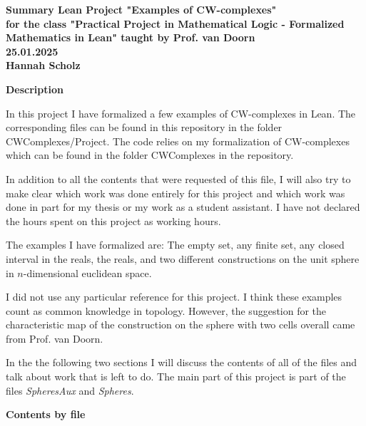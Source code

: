 \documentclass[11pt,a4paper]{article}
\begin{document}
\begin{minipage}{0.75\linewidth}
{
  \Large \bfseries Summary Lean Project "Examples of CW-complexes"\\[0.5ex]
  \mdseries
  \normalsize for the class "Practical Project in Mathematical Logic - Formalized Mathematics in Lean" 
    taught by Prof. van Doorn \\[0.4ex]
  \normalsize 25.01.2025\\[0.4ex]
  \normalsize Hannah Scholz
}
\end{minipage}
\hfill
\begin{minipage}{0.25\linewidth}
\vspace{2mm}
\end{minipage}


\bigskip 
{\bf Description}

\medskip

In this project I have formalized a few examples of CW-complexes in Lean. 
The corresponding files can be found in this repository in the folder CWComplexes/Project.
The code relies on my formalization of CW-complexes which can be found in the folder CWComplexes in the repository.

In addition to all the contents that were requested of this file, I will also try to make clear
which work was done entirely for this project and which work was done in part for my thesis or my work as 
a student assistant. 
I have not declared the hours spent on this project as working hours. 

The examples I have formalized are: The empty set, any finite set, any closed interval in the reals, the reals, and 
two different constructions on the unit sphere in $n$-dimensional euclidean space. 

I did not use any particular reference for this project. I think these examples count as common knowledge in topology.
However, the suggestion for the characteristic map of the construction on the sphere with two cells overall 
came from Prof. van Doorn. 

In the the following two sections I will discuss the contents of all of the files and talk about work that is left to do.
The main part of this project is part of the files \emph{SpheresAux} and \emph{Spheres}.


\bigskip

{\bf Contents by file}

\medskip
\end{document}
